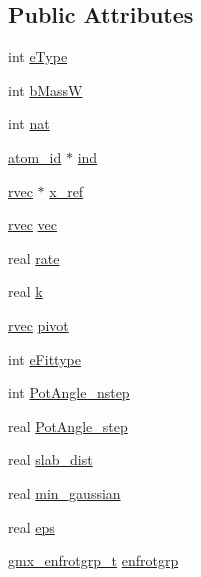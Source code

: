 \subsection*{\-Public \-Attributes}
\begin{DoxyCompactItemize}
\item 
int \hyperlink{structt__rotgrp_abb65d4912b682682356e00c2dbd143bf}{e\-Type}
\item 
int \hyperlink{structt__rotgrp_a8e132137a1e058720468896fb7868e05}{b\-Mass\-W}
\item 
int \hyperlink{structt__rotgrp_ad80b29584eaf4601166813946a62a774}{nat}
\item 
\hyperlink{include_2types_2simple_8h_ad3f47cdb48677e516e2049719612c737}{atom\-\_\-id} $\ast$ \hyperlink{structt__rotgrp_a4df0e7dd37e8dfafb89dbcec9f43e007}{ind}
\item 
\hyperlink{share_2template_2gromacs_2types_2simple_8h_aa02a552a4abd2f180c282a083dc3a999}{rvec} $\ast$ \hyperlink{structt__rotgrp_ad2df571c193f21ae8021b5c08970434f}{x\-\_\-ref}
\item 
\hyperlink{share_2template_2gromacs_2types_2simple_8h_aa02a552a4abd2f180c282a083dc3a999}{rvec} \hyperlink{structt__rotgrp_aaa5e8328e516370d69a3094003145aac}{vec}
\item 
real \hyperlink{structt__rotgrp_a5ee723872c5c0616ea1175586bbf915d}{rate}
\item 
real \hyperlink{structt__rotgrp_a38eecbe4cb71a2e21ca5cf15edb414d3}{k}
\item 
\hyperlink{share_2template_2gromacs_2types_2simple_8h_aa02a552a4abd2f180c282a083dc3a999}{rvec} \hyperlink{structt__rotgrp_ab50612688a98d26b63a585087a9691cd}{pivot}
\item 
int \hyperlink{structt__rotgrp_a05d694ca164761c380285e1d50f013fb}{e\-Fittype}
\item 
int \hyperlink{structt__rotgrp_a1cfdca869226e3b0fbbce4fd0ff9069d}{\-Pot\-Angle\-\_\-nstep}
\item 
real \hyperlink{structt__rotgrp_a591eea5ce78209740336b9984e8a5f4c}{\-Pot\-Angle\-\_\-step}
\item 
real \hyperlink{structt__rotgrp_a5ae7bba53e2a6a244a21c0a1baed57f6}{slab\-\_\-dist}
\item 
real \hyperlink{structt__rotgrp_a3f44bd02f8ac6fa6be6c56d5b10fbe67}{min\-\_\-gaussian}
\item 
real \hyperlink{structt__rotgrp_aa71fd350e0a5e364c875cfe47a17ffc2}{eps}
\item 
\hyperlink{include_2types_2inputrec_8h_ace2759ec4364d18efff8b221bf351d4e}{gmx\-\_\-enfrotgrp\-\_\-t} \hyperlink{structt__rotgrp_a8cde0913b0ba9ce3b10ef705a50d9b57}{enfrotgrp}
\end{DoxyCompactItemize}


